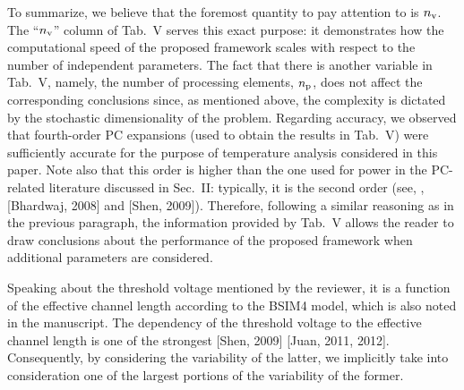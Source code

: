 \begin{authors}
To summarize, we believe that the foremost quantity to pay attention to is ${n_\text{v}}$.
The ``${n_\text{v}}$'' column of Tab.~V serves this exact purpose: it demonstrates how the computational speed of the proposed framework scales with respect to the number of independent parameters.
The fact that there is another variable in Tab.~V, namely, the number of processing elements, ${n_\text{p}}$, does not affect the corresponding conclusions since, as mentioned above, the complexity is dictated by the stochastic dimensionality of the problem.
Regarding accuracy, we observed that fourth-order PC expansions (used to obtain the results in Tab.~V) were sufficiently accurate for the purpose of temperature analysis considered in this paper.
Note also that this order is higher than the one used for power in the PC-related literature discussed in Sec.~II: typically, it is the second order (see, \eg, [Bhardwaj, 2008] and [Shen, 2009]).
Therefore, following a similar reasoning as in the previous paragraph, the information provided by Tab.~V allows the reader to draw conclusions about the performance of the proposed framework when additional parameters are considered.

Speaking about the threshold voltage mentioned by the reviewer, it is a function of the effective channel length according to the BSIM4 model, which is also noted in the manuscript.
The dependency of the threshold voltage to the effective channel length is one of the strongest [Shen, 2009] [Juan, 2011, 2012].
Consequently, by considering the variability of the latter, we implicitly take into consideration one of the largest portions of the variability of the former.

\end{authors}
